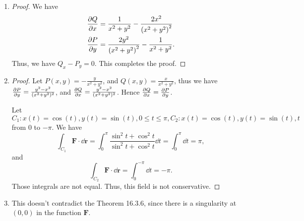 \documentclass[8pt,twocolumn]{article}
\begin{document}
\begin{Answer}[number=40]
  \begin{enumerate}
    \item \begin{proof}
      We have
      \begin{align*}
        \pdv{Q}{x} &= \frac{1}{x^2+y^2}-\frac{2x^2}{\left(x^2+y^2\right)^2} \\
        \pdv{P}{y} &= \frac{2y^2}{\left(x^2+y^2\right)^2}-\frac{1}{x^2+y^2}.
      \end{align*}
      Thus, we have $Q_x - P_y = 0$. This completes the proof.
    \end{proof}
    \item \begin{proof}
      Let $P(x,y) = -\frac{y}{x^2+y^2}$, and $Q(x,y)=\frac{x}{x^2+y^2}$, thus we
      have $\pdv{P}{y} = \frac{y^2-x^2}{(x^2+y^2)^2}$, and $\pdv{Q}{x} =
      \frac{y^2-x^2}{(x^2+y^2)^2}$. Hence $\pdv{Q}{x}=\pdv{P}{y}$.

      Let $C_1: x(t) = \cos(t), y(t) = \sin(t), 0\le t\le \pi, C_2:x(t) = \cos(t),
      y(t) = \sin(t), t$ from $0$ to $-\pi$. We have
      \[
        \int_{C_1} \bm{F}\cdot \dd{\bm{r}} = \int_0^\pi \frac{\sin^2t +
        \cos^2t}{\sin^2t + \cos^2t} \dd{t} = \int_0^\pi \dd{t} = \pi,
      \]
      and
      \[
        \int_{C_2} \bm{F}\cdot \dd{\bm{r}} = \int_0^{-\pi}\dd{t} = -\pi.
      \]
      Those integrals are not equal. Thus, this field is not conservative.
    \end{proof}
    \item This doesn't contradict the Theorem 16.3.6, since there is a
      singularity at $(0,0)$ in the function $\bm{F}$.
  \end{enumerate}
\end{Answer}
\end{document}
